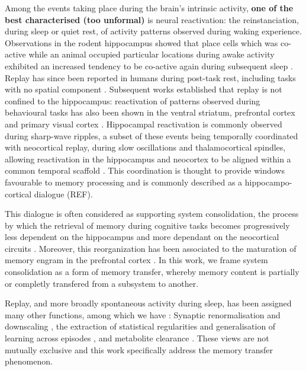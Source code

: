 \documentclass[10pt,letterpaper]{article}
\theoremstyle{plain}
\theoremstyle{remark}
\begin{document}
Among the events taking place during the brain's intrinsic activity, \textbf{one of the best characterised (too unformal)} is neural reactivation: the reinstanciation, during sleep or quiet rest, of activity patterns observed during waking experience. Observations in the rodent hippocampus showed that place cells which was co-active while an animal occupied particular locations during awake activity exhibited an increased tendency to be co-active again during subsequent sleep \cite{wilson1994reactivation}. Replay has since been reported in humans during post-task rest, including tasks with no spatial component \cite{schuck2019sequential,liu2019human}. Subsequent works established that replay is not confined to the hippocampus: reactivation of patterns observed during behavioural tasks has also been shown in the ventral striatum, prefrontal cortex and primary visual cortex \cite{pennartz2004striatum,euston2007pfc,jiwilson2007}. Hippocampal reactivation is commonly observed during sharp-wave ripples, a subset of these events being temporally coordinated with neocortical replay, during slow oscillations and thalamocortical spindles, allowing reactivation in the hippocampus and neocortex to be aligned within a common temporal scaffold \cite{klinzing2019mechanisms,staresina2023coupled}. This coordination is thought to provide windows favourable to memory processing and is commonly described as a hippocampo-cortical dialogue (REF).


This dialogue is often considered as supporting system consolidation, the process by which the retrieval of memory during cognitive tasks becomes progressively less dependent on the hippocampus and more dependant on the neocortical circuits \cite{klinzing2019mechanisms, diekelmann2010memory, squire2015consolidation}. Moreover, this reorganization has been associated to the maturation of memory engram in the prefrontal cortex \cite{kitamura2017engrams}. In this work, we frame system consolidation as a form of memory transfer, whereby memory content is partially or completly transfered from a subsystem to another.

Replay, and more broadly spontaneous activity during sleep, has been assigned many other functions, among which we have : Synaptic renormalisation and downscaling \cite{tononi2014price, tononi2014sleep}, the extraction of statistical regularities and generalisation of learning across episodes \cite{klinzing2019mechanisms}, and metabolite clearance \cite{xie2013sleep}. These views are not mutually exclusive and this work specifically address the memory transfer phenomenon.
\end{document}
